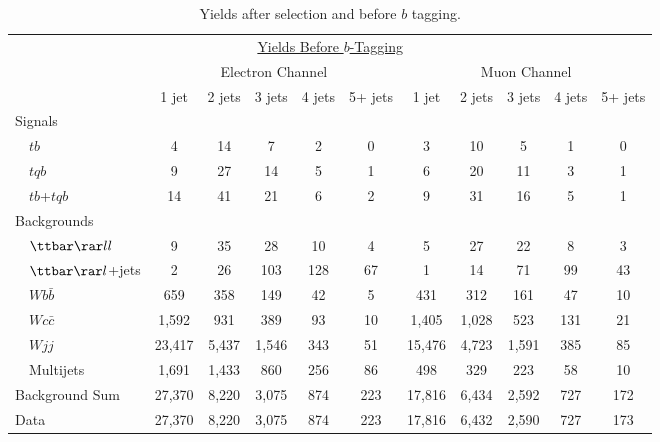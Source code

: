 \begin{table}[!h!tbp]
\begin{center}
\begin{minipage}{6.5in}
\begin{ruledtabular}
\begin{tabular}{l||ccccc|ccccc}
\multicolumn{11}{c}{\hspace{1in}\underline{Yields Before $b$-Tagging}} \vspace{0.1in} \\
& \multicolumn{5}{c|}{Electron Channel} & \multicolumn{5}{c}{Muon Channel} \\
                         & 1 jet & 2 jets & 3 jets & 4 jets & 5+ jets
                         & 1 jet & 2 jets & 3 jets & 4 jets & 5+ jets \\
\hline
Signals                  &        &       &       &       &      &        &       &       &      &      \\
~~$tb$                   &      4 &    14 &     7 &     2 &    0 &      3 &    10 &     5 &    1 &    0 \\
~~$tqb$                  &      9 &    27 &    14 &     5 &    1 &      6 &    20 &    11 &    3 &    1 \\
~~$tb$+$tqb$             &     14 &    41 &    21 &     6 &    2 &      9 &    31 &    16 &    5 &    1 \\
Backgrounds              &        &       &       &       &      &        &       &       &      &      \\
~~${\ttbar}{\rar}ll$     &      9 &    35 &    28 &    10 &    4 &      5 &    27 &    22 &    8 &    3 \\
~~${\ttbar}{\rar}l$+jets &      2 &    26 &   103 &   128 &   67 &      1 &    14 &    71 &   99 &   43 \\
~~$Wb\bar{b}$            &    659 &   358 &   149 &    42 &    5 &    431 &   312 &   161 &   47 &   10 \\
~~$Wc\bar{c}$            &  1,592 &   931 &   389 &    93 &   10 &  1,405 & 1,028 &   523 &  131 &   21 \\
~~$Wjj$                  & 23,417 & 5,437 & 1,546 &   343 &   51 & 15,476 & 4,723 & 1,591 &  385 &   85 \\
~~Multijets              &  1,691 & 1,433 &   860 &   256 &   86 &    498 &   329 &   223 &   58 &   10 \\
\hline
Background Sum           & 27,370 & 8,220 & 3,075 &   874 &  223 & 17,816 & 6,434 & 2,592 &  727 &  172 \\
\hline
Data                     & 27,370 & 8,220 & 3,075 &   874 &  223 & 17,816 & 6,432 & 2,590 &  727 &  173 
\end{tabular}
\end{ruledtabular}
\vspace{-0.1in}
\caption[pretagyields]{Yields after selection and before $b$ tagging.}
\label{pretag-yields}
\end{minipage}
\end{center}
\end{table}

